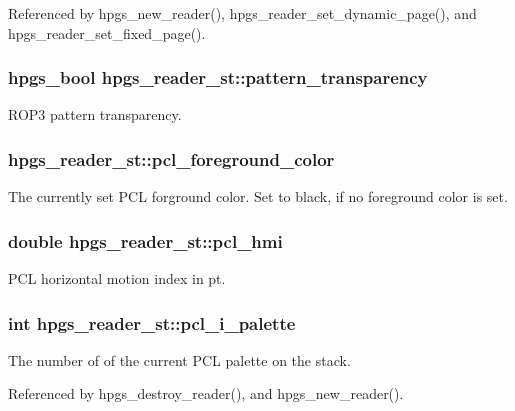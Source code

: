 Referenced by hpgs\_\-new\_\-reader(), hpgs\_\-reader\_\-set\_\-dynamic\_\-page(), and hpgs\_\-reader\_\-set\_\-fixed\_\-page().

\subsubsection[{pattern\_\-transparency}]{\setlength{\rightskip}{0pt plus 5cm}hpgs\_\-bool {\bf hpgs\_\-reader\_\-st::pattern\_\-transparency}}\label{structhpgs__reader__st_ad303bb4fe1c896024fa1883cae6816f0}
ROP3 pattern transparency. 
\subsubsection[{pcl\_\-foreground\_\-color}]{ {\bf hpgs\_\-reader\_\-st::pcl\_\-foreground\_\-color}}\label{structhpgs__reader__st_a1a8109f23e2276a6cdc7b678c4a6462a}
The currently set PCL forground color. Set to black, if no foreground color is set. 
\subsubsection[{pcl\_\-hmi}]{\setlength{\rightskip}{0pt plus 5cm}double {\bf hpgs\_\-reader\_\-st::pcl\_\-hmi}}\label{structhpgs__reader__st_a6a1bba961dbb44a788c407f76a0e7738}
PCL horizontal motion index in pt. 
\subsubsection[{pcl\_\-i\_\-palette}]{\setlength{\rightskip}{0pt plus 5cm}int {\bf hpgs\_\-reader\_\-st::pcl\_\-i\_\-palette}}\label{structhpgs__reader__st_adc791ff7e8c2666ef0b41166f1ae0b74}
The number of of the current PCL palette on the stack. 

Referenced by hpgs\_\-destroy\_\-reader(), and hpgs\_\-new\_\-reader().

